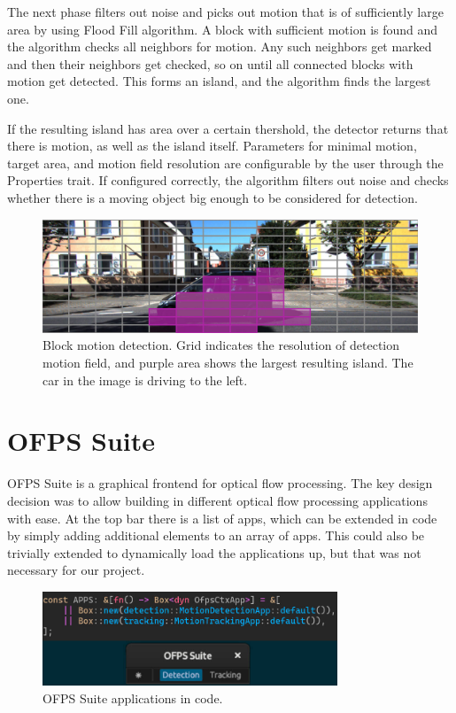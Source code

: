 \documentclass[11pt,english]{report}
\begin{document}
The next phase filters out noise and picks out motion that is of sufficiently large area by using Flood Fill algorithm. A block with sufficient motion is found and the algorithm checks all neighbors for motion. Any such neighbors get marked and then their neighbors get checked, so on until all connected blocks with motion get detected. This forms an island, and the algorithm finds the largest one.

If the resulting island has area over a certain thershold, the detector returns that there is motion, as well as the island itself. Parameters for minimal motion, target area, and motion field resolution are configurable by the user through the Properties trait. If configured correctly, the algorithm filters out noise and checks whether there is a moving object big enough to be considered for detection.

\begin{figure}[!ht]
	\centering
	\includegraphics[width=350pt]{docs/report/detection.jpg}
	\caption{\centering Block motion detection. Grid indicates the resolution of detection motion field, and purple area shows the largest resulting island. The car in the image is driving to the left.}
\end{figure}

\section{OFPS Suite}

OFPS Suite is a graphical frontend for optical flow processing. The key design decision was to allow building in different optical flow processing applications with ease. At the top bar there is a list of apps, which can be extended in code by simply adding additional elements to an array of apps. This could also be trivially extended to dynamically load the applications up, but that was not necessary for our project.

\begin{figure}[!ht]
	\centering
	\includegraphics[width=250pt]{docs/report/ofps-suite-apps.jpg}
	\caption{\centering OFPS Suite applications in code.}
\end{figure}
\end{document}
